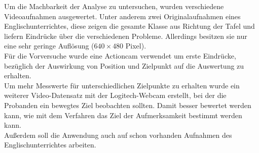 Um die Machbarkeit der Analyse zu untersuchen, wurden verschiedene Videoaufnahmen ausgewertet. Unter anderem zwei Originalaufnahmen eines Englischunterrichtes, diese zeigen die gesamte Klasse aus Richtung der Tafel und liefern Eindrücke über die verschiedenen Probleme. Allerdings besitzen sie nur eine sehr geringe Auflösung ($640\times 480$ Pixel).\\
Für die Vorversuche wurde eine Actioncam verwendet um erste Eindrücke, bezüglich der Auswirkung von Position und Zielpunkt auf die Auswertung zu erhalten.\\
Um mehr Messwerte für unterschiedlichen Zielpunkte zu erhalten wurde ein weiterer Video-Datensatz mit der Logitech-Webcam erstellt, bei der die Probanden ein bewegtes Ziel beobachten sollten. Damit besser bewertet werden kann, wie mit dem Verfahren das Ziel der Aufmerksamkeit bestimmt werden kann.\\
Außerdem soll die Anwendung auch auf schon vorhanden Aufnahmen des Englischunterrichtes arbeiten.
